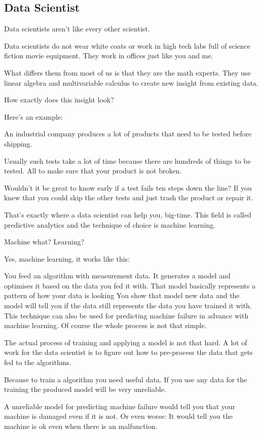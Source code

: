 \documentclass[12pt]{scrartcl} %
\begin{document}
\subsection{Data Scientist}
Data scientists aren’t like every other scientist.

Data scientists do not wear white coats or work in high tech labs full of science fiction movie equipment. They work in offices just like you and me.

What differs them from most of us is that they are the math experts. They use linear algebra and multivariable calculus to create new insight from existing data.

How exactly does this insight look?

Here’s an example:

An industrial company produces a lot of products that need to be tested before shipping.

Usually such tests take a lot of time because there are hundreds of things to be tested. All to make sure that your product is not broken.

Wouldn’t it be great to know early if a test fails ten steps down the line? If you knew that you could skip the other tests and just trash the product or repair it.

That’s exactly where a data scientist can help you, big-time. This field is called predictive analytics and the technique of choice is machine learning.

Machine what? Learning?

Yes, machine learning, it works like this:

You feed an algorithm with measurement data.
It generates a model and optimises it based on the data you fed it with. That model basically represents a pattern of how your data is looking
You show that model new data and the model will tell you if the data still represents the data you have trained it with.
This technique can also be used for predicting machine failure in advance with machine learning. Of course the whole process is not that simple.

The actual process of training and applying a model is not that hard. A lot of work for the data scientist is to figure out how to pre-process the data that gets fed to the algorithms.

Because to train a algorithm you need useful data. If you use any data for the training the produced model will be very unreliable.

A unreliable model for predicting machine failure would tell you that your machine is damaged even if it is not. Or even worse: It would tell you the machine is ok even when there is an malfunction.
\end{document}
